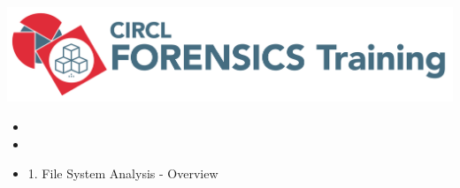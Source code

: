 %
%



\begin{frame}
    \includegraphics[scale=0.3]{images/logo-circl-Forensics.png}
    \begin{itemize}
        \item[]
        \item[]
        \item[] 1. File System Analysis - Overview
    \end{itemize}
\end{frame}


